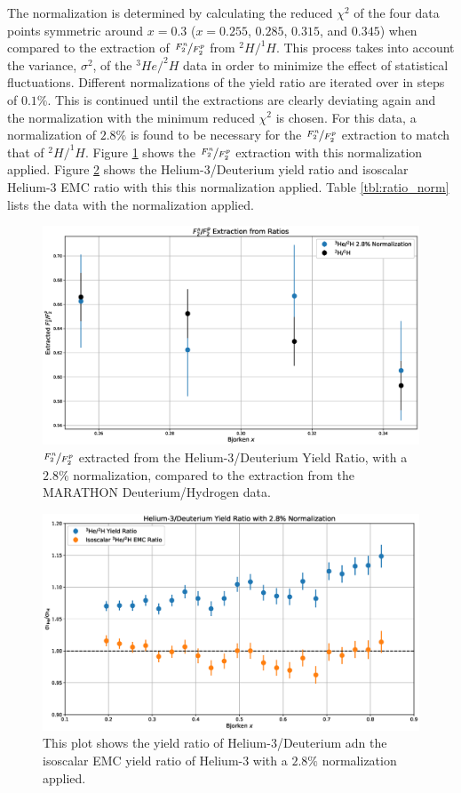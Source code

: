 The normalization is determined by calculating the reduced $\chi^2$ of the four data points symmetric around $x=0.3$ ($x=0.255$, $0.285$, $0.315$, and $0.345$) when compared to the extraction of $\nicefrac{F_2^n}{F_2^p}$ from $^2H/^1H$. This process takes into account the variance, $\sigma^2$, of the $^3He/^2H$ data in order to minimize the effect of statistical fluctuations. Different normalizations of the yield ratio are iterated over in steps of $0.1\%$. This is continued until the extractions are clearly deviating again and the normalization with the minimum reduced $\chi^2$ is chosen. For this data, a normalization of $2.8\%$ is found to be necessary for the $\nicefrac{F_2^n}{F_2^p}$ extraction to match that of $^2H/^1H$. Figure \ref{fig:f2r_norm} shows the $\nicefrac{F_2^n}{F_2^p}$ extraction with this normalization applied. Figure \ref{fig:ratio_norm} shows the Helium-3/Deuterium yield ratio and isoscalar Helium-3 EMC ratio with this this normalization applied. Table \ref{tbl:ratio_norm} lists the data with the normalization applied.

\begin{figure}[p]
	\includegraphics[width=\textwidth]{./results/fig/f2r_norm.eps}
	\caption{$\nicefrac{F_2^n}{F_2^p}$ extracted from the Helium-3/Deuterium Yield Ratio, with a $2.8\%$ normalization, compared to the extraction from the MARATHON Deuterium/Hydrogen data.}
	\label{fig:f2r_norm}
\end{figure}

\begin{figure}[p]
	\includegraphics[width=\textwidth]{./results/fig/ratio_norm.eps}
	\caption{This plot shows the yield ratio of Helium-3/Deuterium adn the isoscalar EMC yield ratio of Helium-3 with a $2.8\%$ normalization applied.}
	\label{fig:ratio_norm}
\end{figure}

